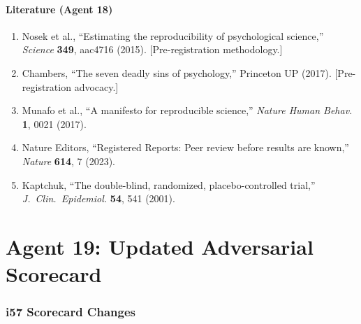 \documentclass[11pt,a4paper]{article}
\begin{document}
\subsection{Literature (Agent 18)}

\begin{enumerate}
\item Nosek et al., ``Estimating the reproducibility of psychological science,'' \textit{Science} \textbf{349}, aac4716 (2015). [Pre-registration methodology.]
\item Chambers, ``The seven deadly sins of psychology,'' Princeton UP (2017). [Pre-registration advocacy.]
\item Munafo et al., ``A manifesto for reproducible science,'' \textit{Nature Human Behav.} \textbf{1}, 0021 (2017).
\item Nature Editors, ``Registered Reports: Peer review before results are known,'' \textit{Nature} \textbf{614}, 7 (2023).
\item Kaptchuk, ``The double-blind, randomized, placebo-controlled trial,'' \textit{J.\ Clin.\ Epidemiol.} \textbf{54}, 541 (2001).
\end{enumerate}


\part{Agent 19: Updated Adversarial Scorecard}
\label{part:scorecard}

\section{i57 Scorecard Changes}
\end{document}
